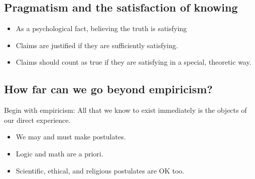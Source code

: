 \documentclass[10pt]{article}
\begin{document}
\subsection{Pragmatism and the satisfaction of knowing}
\begin{itemize}
\item As a psychological fact, believing the truth is satisfying \marginpar{[7]}

\item Claims are justified if they are sufficiently satisfying. \marginpar{[8]}

\item Claims should count as true if they are satisfying in a special, theoretic way. \marginpar{[9]}

\end{itemize}

\subsection{How far can we go beyond empiricism?}

Begin with empiricism: All that we know to exist immediately is the objects of our direct experience.
\begin{itemize}

\item We may and must make postulates. \marginpar{[10]}

\item Logic and math are a priori. \marginpar{[11]}


\item Scientific, ethical, and religious postulates are OK too. \marginpar{[12]}



\end{itemize}
\label{theend}
\end{document}
